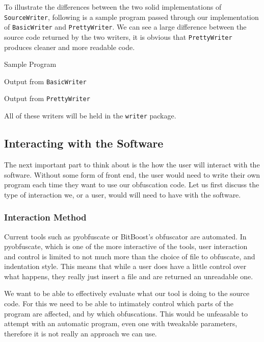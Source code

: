 \documentclass{report}
\begin{document}
To illustrate the differences between the two solid implementations of \texttt{SourceWriter}, following is a sample program passed through our implementation of
\texttt{BasicWriter} and \texttt{PrettyWriter}. We can see a large difference between the source code returned by the two writers, it is obvious that
\texttt{PrettyWriter} produces cleaner and more readable code.

Sample Program



Output from \texttt{BasicWriter}



Output from \texttt{PrettyWriter}



All of these writers will be held in the \texttt{writer} package.

\subsection{Interacting with the Software}

The next important part to think about is the how the user will interact with the software. Without some form of front end, the
user would need to write their own program each time they want to use our obfuscation code. Let us first discuss the type of
interaction we, or a user, would will need to have with the software.

\subsubsection{Interaction Method}

Current tools such as pyobfuscate or BitBoost's obfuscator are automated. In pyobfuscate, which is one of the more interactive
of the tools, user interaction and control is limited to not much more than the choice of file to obfuscate, and indentation style. This means
that while a user does have a little control over what happens, they really just insert a file and are returned an
unreadable one.

We want to be able to effectively evaluate what our tool is doing to the source code. For this we need to be able to intimately control
which parts of the program are affected, and by which obfuscations. This would be unfeasable to attempt with an automatic program,
even one with tweakable parameters, therefore it is not really an approach we can use.
\end{document}
